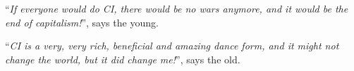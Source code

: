 \begin{displayquote}
    ``\textit{If everyone would do CI, there would be no wars anymore, and it would be the end of capitalism!}'', says the young.
\end{displayquote}

\begin{displayquote}
    ``\textit{CI is a very, very rich, beneficial and amazing dance form, and it might not change the world, but it did change me!}'', says the old.
\end{displayquote}
